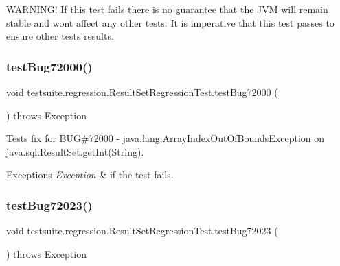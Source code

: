 W\+A\+R\+N\+I\+N\+G! If this test fails there is no guarantee that the J\+VM will remain stable and won\textquotesingle{}t affect any other tests. It is imperative that this test passes to ensure other tests results. \mbox{\label{classtestsuite_1_1regression_1_1_result_set_regression_test_ac5cb7a4e2ccabb68566100d643272bb4}} 
\subsubsection{\texorpdfstring{test\+Bug72000()}{testBug72000()}}
{\footnotesize\ttfamily void testsuite.\+regression.\+Result\+Set\+Regression\+Test.\+test\+Bug72000 (\begin{DoxyParamCaption}{ }\end{DoxyParamCaption}) throws Exception}

Tests fix for B\+UG\#72000 -\/ java.\+lang.\+Array\+Index\+Out\+Of\+Bounds\+Exception on java.\+sql.\+Result\+Set.\+get\+Int(\+String).


\begin{DoxyExceptions}{Exceptions}
{\em Exception} & if the test fails. \\
\hline
\end{DoxyExceptions}
\mbox{\label{classtestsuite_1_1regression_1_1_result_set_regression_test_a86a107fd1b712bfc306b455d84d42572}} 
\subsubsection{\texorpdfstring{test\+Bug72023()}{testBug72023()}}
{\footnotesize\ttfamily void testsuite.\+regression.\+Result\+Set\+Regression\+Test.\+test\+Bug72023 (\begin{DoxyParamCaption}{ }\end{DoxyParamCaption}) throws Exception}

